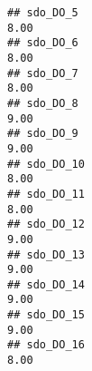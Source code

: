 \documentclass[
]{article}
\begin{document}
\begin{verbatim}
## sdo_DO_5                                                                                                                                                                                                                     8.00
## sdo_DO_6                                                                                                                                                                                                                     8.00
## sdo_DO_7                                                                                                                                                                                                                     8.00
## sdo_DO_8                                                                                                                                                                                                                     9.00
## sdo_DO_9                                                                                                                                                                                                                     9.00
## sdo_DO_10                                                                                                                                                                                                                    8.00
## sdo_DO_11                                                                                                                                                                                                                    8.00
## sdo_DO_12                                                                                                                                                                                                                    9.00
## sdo_DO_13                                                                                                                                                                                                                    9.00
## sdo_DO_14                                                                                                                                                                                                                    9.00
## sdo_DO_15                                                                                                                                                                                                                    9.00
## sdo_DO_16                                                                                                                                                                                                                    8.00

\end{verbatim}
\end{document}
